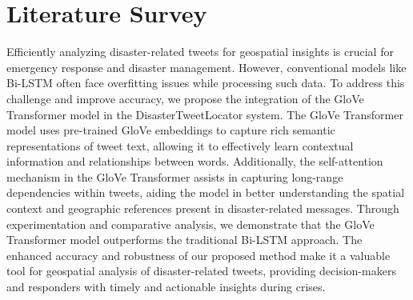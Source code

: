 \documentclass[conference]{IEEEtran}
\begin{document}
\section{Literature Survey}
Efficiently analyzing disaster-related tweets for geospatial insights is crucial for emergency response and disaster management. However, conventional models like Bi-LSTM often face overfitting issues while processing such data. To address this challenge and improve accuracy, we propose the integration of the GloVe Transformer model in the DisasterTweetLocator system. The GloVe Transformer model uses pre-trained GloVe embeddings to capture rich semantic representations of tweet text, allowing it to effectively learn contextual information and relationships between words. Additionally, the self-attention mechanism in the GloVe Transformer assists in capturing long-range dependencies within tweets, aiding the model in better understanding the spatial context and geographic references present in disaster-related messages. Through experimentation and comparative analysis, we demonstrate that the GloVe Transformer model outperforms the traditional Bi-LSTM approach. The enhanced accuracy and robustness of our proposed method make it a valuable tool for geospatial analysis of disaster-related tweets, providing decision-makers and responders with timely and actionable insights during crises.
\end{document}
